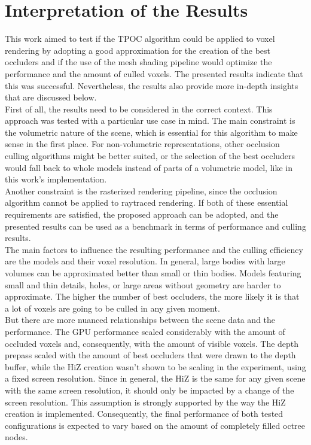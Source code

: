 \section{Interpretation of the Results}

This work aimed to test if the \ac{TPOC} algorithm could be applied to voxel rendering by adopting a good approximation 
for the creation of the best occluders and if the use of the mesh shading pipeline would optimize the performance and 
the amount of culled voxels. The presented results indicate that this was successful. Nevertheless, the results also 
provide more in-depth insights that are discussed below. \\

\noindent
First of all, the results need to be considered in the correct context. This approach was tested with a particular use 
case in mind. The main constraint is the volumetric nature of the scene, which is essential for this algorithm to make 
sense in the first place. For non-volumetric representations, other occlusion culling algorithms might be better suited, 
or the selection of the best occluders would fall back to whole models instead of parts of a volumetric model, like in 
this work's implementation. \\

\noindent
Another constraint is the rasterized rendering pipeline, since the occlusion algorithm cannot be applied to 
raytraced rendering. If both of these essential requirements are satisfied, the proposed approach can be adopted, and the 
presented results can be used as a benchmark in terms of performance and culling results. \\

\noindent
The main factors to influence the resulting performance and the culling efficiency are the models and their voxel resolution.
In general, large bodies with large volumes can be approximated better than small or thin bodies. Models featuring small and 
thin details, holes, or large areas without geometry are harder to approximate. The higher the number of best occluders, the 
more likely it is that a lot of voxels are going to be culled in any given moment. \\

\noindent
But there are more nuanced relationships between the scene data and the performance. The \ac{GPU} performance scaled considerably 
with the amount of occluded voxels and, consequently, with the amount of visible voxels. The depth prepass scaled with the amount 
of best occluders that were drawn to the depth buffer, while the \ac{HiZ} creation wasn't shown to be scaling in the experiment, 
using a fixed screen resolution. Since in general, the \ac{HiZ} is the same for any given scene with the same screen resolution, 
it should only be impacted by a change of the screen resolution. This assumption is strongly supported by the way the \ac{HiZ} 
creation is implemented. Consequently, the final performance of both tested configurations is expected to vary based on the amount 
of completely filled octree nodes. \\

